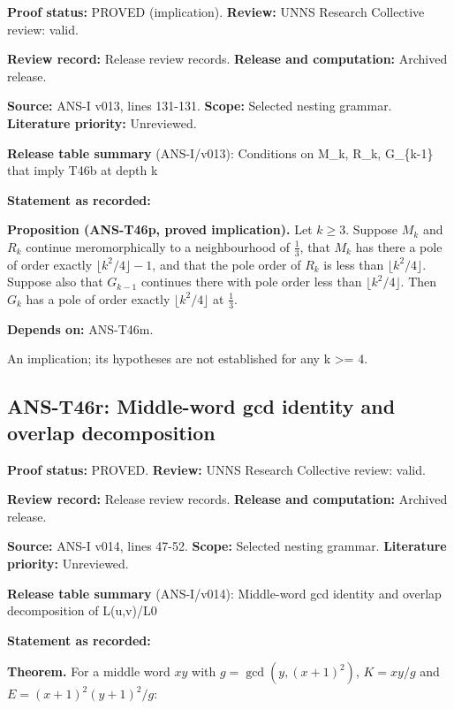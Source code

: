\documentclass[
  11pt,
]{article}
\begin{document}
\textbf{Proof status:} PROVED (implication). \textbf{Review:} UNNS
Research Collective review: valid.

\textbf{Review record:} Release review records. \textbf{Release and
computation:} Archived release.

\textbf{Source:} ANS-I v013, lines 131-131. \textbf{Scope:} Selected
nesting grammar. \textbf{Literature priority:} Unreviewed.

\textbf{Release table summary} (ANS-I/v013): Conditions on M\_k, R\_k,
G\_\{k-1\} that imply T46b at depth k

\textbf{Statement as recorded:}

\textbf{Proposition (ANS-T46p, proved implication).} Let \(k\ge3\).
Suppose \(M_k\) and \(R_k\) continue meromorphically to a neighbourhood
of \(\frac13\), that \(M_k\) has there a pole of order exactly
\(\lfloor k^2/4\rfloor-1\), and that the pole order of \(R_k\) is less
than \(\lfloor k^2/4\rfloor\). Suppose also that \(G_{k-1}\) continues
there with pole order less than \(\lfloor k^2/4\rfloor\). Then \(G_k\)
has a pole of order exactly \(\lfloor k^2/4\rfloor\) at \(\frac13\).

\textbf{Depends on:} ANS-T46m.

An implication; its hypotheses are not established for any k
\textgreater= 4.

\hypertarget{ans-t46r-middle-word-gcd-identity-and-overlap-decomposition}{%
\subsection{ANS-T46r: Middle-word gcd identity and overlap
decomposition}\label{ans-t46r-middle-word-gcd-identity-and-overlap-decomposition}}

\textbf{Proof status:} PROVED. \textbf{Review:} UNNS Research Collective
review: valid.

\textbf{Review record:} Release review records. \textbf{Release and
computation:} Archived release.

\textbf{Source:} ANS-I v014, lines 47-52. \textbf{Scope:} Selected
nesting grammar. \textbf{Literature priority:} Unreviewed.

\textbf{Release table summary} (ANS-I/v014): Middle-word gcd identity
and overlap decomposition of L(u,v)/L0

\textbf{Statement as recorded:}

\textbf{Theorem.} For a middle word \(xy\) with \(g=\gcd(y,(x+1)^2)\),
\(K=xy/g\) and \(E=(x+1)^2(y+1)^2/g\):
\end{document}
